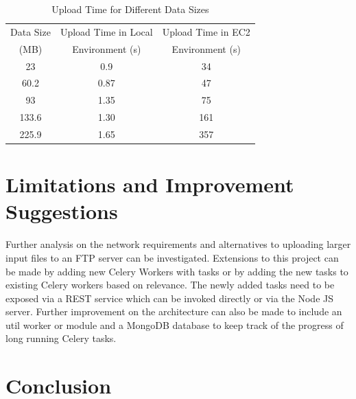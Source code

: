 \begin{table}[htbp]
	\centering
	\caption{Upload Time for Different Data 
	Sizes}\label{tbl:datasizestimebreakdown}
	\begin{tabular}{*{3}{c}}
		\toprule
		Data Size & Upload Time in Local & Upload Time in EC2 \\
		(MB) & Environment (s) & Environment (s) \\
		\midrule
		23    &   0.9    &  34  \\ \midrule
		60.2  &   0.87   &  47  \\ \midrule
		93    &   1.35   &  75  \\ \midrule
		133.6 &   1.30   &  161 \\ \midrule
		225.9 &   1.65   &  357 \\
		\bottomrule
	\end{tabular}
\end{table}
 
\section{Limitations and Improvement Suggestions}

Further analysis on the network requirements and alternatives to uploading 
larger input files to an FTP server can be investigated. Extensions to this 
project can be made by adding new Celery Workers with tasks or by adding 
the new tasks to existing Celery workers based on relevance. The newly added 
tasks need to be exposed via a REST service which can be invoked directly or 
via the Node JS server. Further improvement on the architecture can also be 
made to include an util worker or module and a MongoDB database to keep track 
of the progress of long running Celery tasks.

\section{Conclusion}

